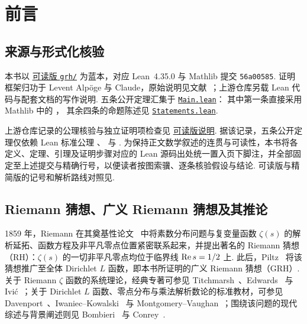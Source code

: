 \chapter*{前言}

\section*{来源与形式化核验}

本书以
\href{https://github.com/lsernau/grh-lean/tree/72fead102f663d5c7a407964a13dc0cf9d977207/grh}{可读版 \texttt{grh/}}
为蓝本，对应 Lean~4.35.0 与 Mathlib 提交 \texttt{56a00585}. 证明框架归功于 Levent Alpöge 与 Claude，原始说明见文献~\cite{Alpoge2026}；上游仓库另载 Lean 代码与配套文档的写作说明. 五条公开定理汇集于
\href{https://github.com/lsernau/grh-lean/blob/72fead102f663d5c7a407964a13dc0cf9d977207/grh/src/Main.lean}{\texttt{Main.lean}}：
其中第一条直接采用 Mathlib 中的
，
其余四条的命题陈述见
\href{https://github.com/lsernau/grh-lean/blob/72fead102f663d5c7a407964a13dc0cf9d977207/grh/src/Statements.lean}{\texttt{Statements.lean}}.

上游仓库记录的公理核验与独立证明项检查见
\href{https://github.com/lsernau/grh-lean/blob/72fead102f663d5c7a407964a13dc0cf9d977207/grh/README.md}{可读版说明}.
据该记录，五条公开定理仅依赖 Lean 标准公理 、 与 . 为保持正文数学叙述的连贯与可读性，本书将各定义、定理、引理及证明步骤对应的 Lean 源码出处统一置入页下脚注，并全部固定至上述提交与精确行号，以便读者按图索骥、逐条核验假设与结论. 可读版与精简版的记号和解析路线对照见.

\section*{Riemann 猜想、广义 Riemann 猜想及其推论}

1859 年，Riemann 在其奠基性论文~\cite{Riemann1859} 中将素数分布问题与复变量函数 $\zeta(s)$ 的解析延拓、函数方程及非平凡零点位置紧密联系起来，并提出著名的 Riemann 猜想（RH）：$\zeta(s)$ 的一切非平凡零点均位于临界线 $\operatorname{Re} s=1/2$ 上. 此后，Piltz~\cite{Piltz1884} 将该猜想推广至全体 Dirichlet $L$ 函数，即本书所证明的广义 Riemann 猜想（GRH）. 关于 Riemann $\zeta$ 函数的系统理论，经典专著可参见 Titchmarsh~\cite{Titchmarsh1986}、Edwards~\cite{Edwards1974} 与 Ivić~\cite{Ivic1985}；关于 Dirichlet $L$ 函数、零点分布与乘法解析数论的标准教材，可参见 Davenport~\cite{Davenport2000}、Iwaniec--Kowalski~\cite{IwaniecKowalski2004} 与 Montgomery--Vaughan~\cite{MontgomeryVaughan2007}；围绕该问题的现代综述与背景阐述则见 Bombieri~\cite{Bombieri2000} 与 Conrey~\cite{Conrey2003}.

